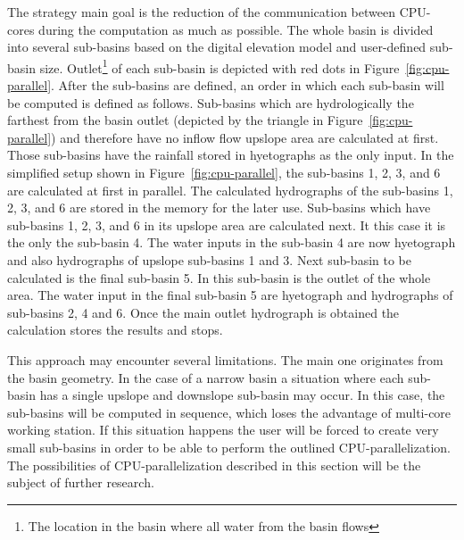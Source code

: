 The strategy main goal is the reduction of
the communication between CPU-cores during the computation as much as
possible. The whole basin is divided into several sub-basins based on
the digital elevation model and user-defined sub-basin size. 
Outlet\footnote{The location in the basin where all water from the basin flows} 
of each sub-basin is depicted with
red dots in Figure~\ref{fig:cpu-parallel}. After the sub-basins
are defined, an order in which each sub-basin will be computed is defined as
follows. Sub-basins which are hydrologically the farthest from the
basin outlet (depicted by the triangle in Figure~\ref{fig:cpu-parallel}) 
and therefore have no inflow flow upslope area are
calculated at first. Those sub-basins have the rainfall stored in
hyetographs as the only input. In the simplified setup shown in
Figure~\ref{fig:cpu-parallel}, the sub-basins 1, 2, 3, and 6 are
calculated at first in parallel. The calculated hydrographs of the
sub-basins 1, 2, 3, and 6 are stored in the memory for the later use. 
Sub-basins which have sub-basins 1, 2, 3, and 6 in its upslope area 
are calculated next. 
It this case it is the only the sub-basin 4. The water inputs in
the sub-basin 4 are now hyetograph and also hydrographs of
upslope sub-basins 1 and 3. 
Next sub-basin to be calculated is the final sub-basin 5. 
In this sub-basin is the outlet of the whole area.
The water input in the final sub-basin 5 are hyetograph and hydrographs 
of sub-basins 2, 4 and 6. Once the main outlet hydrograph is obtained 
the calculation stores the results and stops. 

This approach may encounter several limitations. The main one 
originates from the basin geometry. In the case of a narrow  basin a situation 
where each sub-basin has a single upslope and downslope sub-basin may occur.
In this case, the sub-basins will be computed in sequence, which
loses the advantage of multi-core working station. If this situation happens
the user will be forced to create very small sub-basins in order to be able 
to perform the outlined CPU-parallelization. The possibilities of CPU-parallelization
described in this section will be the subject of further research.
